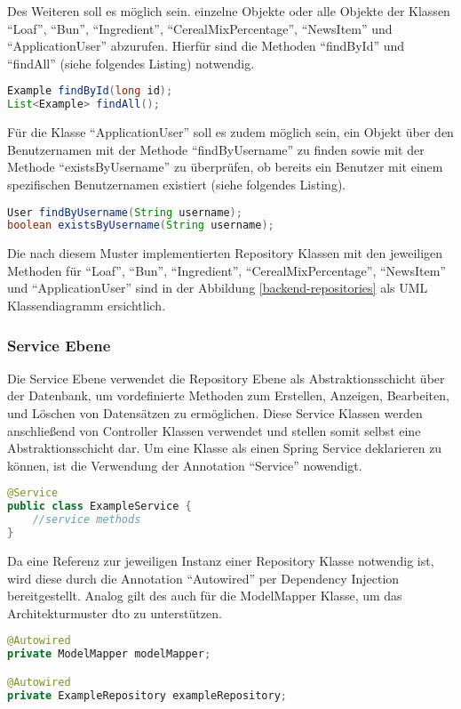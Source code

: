 Des Weiteren soll es möglich sein. einzelne Objekte oder alle Objekte der Klassen \enquote{Loaf}, \enquote{Bun}, \enquote{Ingredient}, \enquote{CerealMixPercentage}, \enquote{NewsItem} und \enquote{ApplicationUser} abzurufen.
Hierfür sind die Methoden \enquote{findById} und \enquote{findAll} (siehe folgendes Listing) notwendig.
\begin{lstlisting}[language=Java]
Example findById(long id);
List<Example> findAll();
\end{lstlisting}

Für die Klasse \enquote{ApplicationUser} soll es zudem möglich sein, ein Objekt über den Benutzernamen mit der Methode \enquote{findByUsername} zu finden sowie mit der Methode \enquote{existsByUsername} zu überprüfen, ob bereits ein Benutzer mit einem spezifischen Benutzernamen existiert (siehe folgendes Listing).
\begin{lstlisting}[language=Java]
User findByUsername(String username);
boolean existsByUsername(String username);
\end{lstlisting}
Die nach diesem Muster implementierten Repository Klassen mit den jeweiligen Methoden für \enquote{Loaf}, \enquote{Bun}, \enquote{Ingredient}, \enquote{CerealMixPercentage}, \enquote{NewsItem} und \enquote{ApplicationUser} sind in der Abbildung \ref{backend-repositories} als UML Klassendiagramm ersichtlich.


\clearpage

\subsubsection{Service Ebene}
Die Service Ebene verwendet die Repository Ebene als Abstraktionsschicht über der Datenbank, um vordefinierte Methoden zum Erstellen, Anzeigen, Bearbeiten, und Löschen von Datensätzen zu ermöglichen. Diese Service Klassen werden anschließend von Controller Klassen verwendet und stellen somit selbst eine Abstraktionsschicht dar.
Um eine Klasse als einen Spring Service deklarieren zu können, ist die Verwendung der Annotation \enquote{Service} nowendigt.
\begin{lstlisting}[language=Java]
@Service
public class ExampleService {
	//service methods
}
\end{lstlisting}

Da eine Referenz zur jeweiligen Instanz einer Repository Klasse notwendig ist, wird diese durch die Annotation \enquote{Autowired} per Dependency Injection bereitgestellt. Analog gilt des auch für die ModelMapper Klasse, um das Architekturmuster \gls{dto} zu unterstützen.
\begin{lstlisting}[language=Java]
@Autowired
private ModelMapper modelMapper;

@Autowired
private ExampleRepository exampleRepository;
\end{lstlisting}

